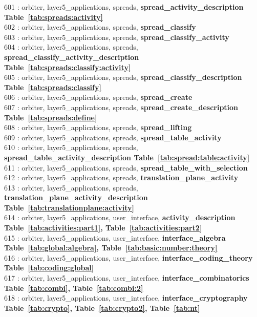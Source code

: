 601 : orbiter, layer5\_applications, spreads, {\bf spread\_activity\_description Table~\ref{tab:spreads:activity}}\\
602 : orbiter, layer5\_applications, spreads, {\bf spread\_classify}\\
603 : orbiter, layer5\_applications, spreads, {\bf spread\_classify\_activity}\\
604 : orbiter, layer5\_applications, spreads, {\bf spread\_classify\_activity\_description Table~\ref{tab:spreads:classify:activity}}\\
605 : orbiter, layer5\_applications, spreads, {\bf spread\_classify\_description Table~\ref{tab:spreads:classify}}\\
606 : orbiter, layer5\_applications, spreads, {\bf spread\_create}\\
607 : orbiter, layer5\_applications, spreads, {\bf spread\_create\_description Table~\ref{tab:spreads:define}}\\
608 : orbiter, layer5\_applications, spreads, {\bf spread\_lifting}\\
609 : orbiter, layer5\_applications, spreads, {\bf spread\_table\_activity}\\
610 : orbiter, layer5\_applications, spreads, {\bf spread\_table\_activity\_description Table~\ref{tab:spread:table:activity}}\\
611 : orbiter, layer5\_applications, spreads, {\bf spread\_table\_with\_selection}\\
612 : orbiter, layer5\_applications, spreads, {\bf translation\_plane\_activity}\\
613 : orbiter, layer5\_applications, spreads, {\bf translation\_plane\_activity\_description Table~\ref{tab:translationplane:activity}}\\
614 : orbiter, layer5\_applications, user\_interface, {\bf activity\_description Table~\ref{tab:activities:part1},  Table~\ref{tab:activities:part2}}\\
615 : orbiter, layer5\_applications, user\_interface, {\bf interface\_algebra Table~\ref{tab:global:algebra},  Table~\ref{tab:basic:number:theory}}\\
616 : orbiter, layer5\_applications, user\_interface, {\bf interface\_coding\_theory Table~\ref{tab:coding:global}}\\
617 : orbiter, layer5\_applications, user\_interface, {\bf interface\_combinatorics Table~\ref{tab:combi},  Table~\ref{tab:combi:2}}\\
618 : orbiter, layer5\_applications, user\_interface, {\bf interface\_cryptography Table~\ref{tab:crypto},  Table~\ref{tab:crypto2},  Table~\ref{tab:nt}}\\
